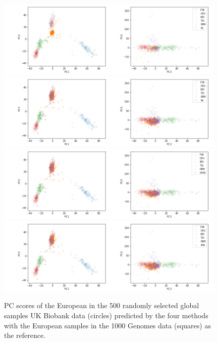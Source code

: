 \documentclass{article}
\begin{document}
\begin{figure}[p]
  \centering
  \includegraphics[width=0.98\textwidth]{img/ukb_snpscap_kgn_bial_orphans_5c_pred_EUR_sturef_kgn_bial_orphans_snps_ukb_snpscap_ukb_EUR_sp}
  \includegraphics[width=0.98\textwidth]{img/ukb_snpscap_kgn_bial_orphans_5c_pred_EUR_sturef_kgn_bial_orphans_snps_ukb_snpscap_ukb_EUR_ap}
  \includegraphics[width=0.98\textwidth]{img/ukb_snpscap_kgn_bial_orphans_5c_pred_EUR_sturef_kgn_bial_orphans_snps_ukb_snpscap_ukb_EUR_oadp}
  \includegraphics[width=0.98\textwidth]{img/ukb_snpscap_kgn_bial_orphans_5c_pred_EUR_sturef_kgn_bial_orphans_snps_ukb_snpscap_ukb_EUR_adp}
  \caption{PC scores of the European in the 500 randomly selected global samples UK Biobank data (circles) predicted by the four methods with the European samples in the 1000 Genomes data (squares) as the reference.}
\end{figure}
\end{document}

